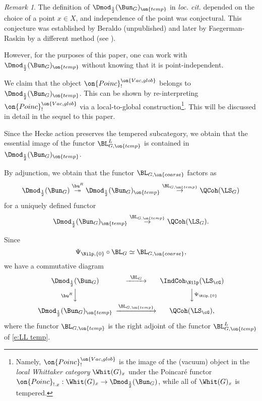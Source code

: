 \documentclass[9pt]{amsart}
\theoremstyle{remark}
\newtheorem{rem}[subsubsection]{Remark}
\theoremstyle{definition}
\theoremstyle{remark}
\numberwithin{equation}{section}
\begin{document}
\begin{rem}
The definition of $\Dmod_{\frac{1}{2}}(\Bun_G)_{\on{temp}}$ in {\it loc. cit.} depended on the choice of a point $x\in X$,
and independence of the point was conjectural. This conjecture was established by Beraldo (unpublished) and later
by Faegerman-Raskin by a different method (see \cite[Sect. 2.6.2]{FR}). 

\medskip

However, for the purposes of this paper, one can work with $\Dmod_{\frac{1}{2}}(\Bun_G)_{\on{temp}}$ without
knowing that it is point-independent. 

\end{rem} 

\sssec{} \label{sss:LL temp}

We claim that the object $\on{Poinc}_!^{\on{Vac,glob}}$ belongs to $\Dmod_{\frac{1}{2}}(\Bun_G)_{\on{temp}}$. This can be shown 
by re-interpreting $\on{Poinc}_!^{\on{Vac,glob}}$ via a local-to-global 
construction\footnote{Namely, $\on{Poinc}_!^{\on{Vac,glob}}$ is the image of the (vacuum) object in the \emph{local Whittaker category}
$\Whit(G)_x$ under the Poincar\'e functor $\on{Poinc}_{!.x}:\Whit(G)_x\to \Dmod_{\frac{1}{2}}(\Bun_G)$, while all of $\Whit(G)_x$
is tempered.}. This will be discussed in detail in the sequel to this paper.   

\medskip

Since the Hecke action preserves the tempered subcategory, we obtain that the essential image of the functor $\BL^L_{G,\on{temp}}$ is 
contained in $\Dmod_{\frac{1}{2}}(\Bun_G)_{\on{temp}}$.

\medskip

By adjunction, we obtain that the functor $\BL_{G,\on{coarse}}$
factors as
$$\Dmod_{\frac{1}{2}}(\Bun_G) \overset{\bu^R}\twoheadrightarrow \Dmod_{\frac{1}{2}}(\Bun_G)_{\on{temp}}
\overset{\BL_{G,\on{temp}}}\to \QCoh(\LS_G)$$
for a uniquely defined functor
$$\Dmod_{\frac{1}{2}}(\Bun_G)_{\on{temp}}
\overset{\BL_{G,\on{temp}}}\to \QCoh(\LS_G).$$

\medskip

Since
$$\Psi_{\Nilp,\{0\}}\circ \BL_G\simeq \BL_{G,\on{coarse}},$$
we have a commutative diagram
\begin{equation} \label{e:temp diag}
\CD
\Dmod_{\frac{1}{2}}(\Bun_G)  @>{\BL_G}>> \IndCoh_\Nilp(\LS_\cG) \\
@V{\bu^R}VV @VV{\Psi_{\Nilp,\{0\}}}V \\
\Dmod_{\frac{1}{2}}(\Bun_G)_{\on{temp}} @>{\BL_{G,\on{temp}}}>> \QCoh(\LS_\cG),
\endCD
\end{equation}
where the functor $\BL_{G,\on{temp}}$ is the right adjoint of the functor $\BL^L_{G,\on{temp}}$
of \eqref{e:LL temp}.
\end{document}
